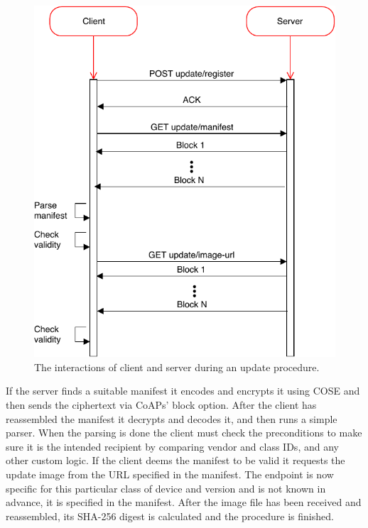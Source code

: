 \documentclass[0-thesis.tex]{subfiles}
\begin{document}
\begin{figure}
    \caption{The interactions of client and server during an update procedure.}
    \label{fig:client-server-interaction}
    \includegraphics{images/client-server-sequence.pdf}
\end{figure}

If the server finds a suitable manifest it encodes and encrypts it using COSE and then
sends the ciphertext via CoAPs' block option. After the client has reassembled the
manifest it decrypts and decodes it, and then runs a simple parser. When the parsing is
done the client must check the preconditions to make sure it is the intended recipient by
comparing vendor and class IDs, and any other custom logic. If the client deems the
manifest to be valid it requests the update image from the URL specified in the manifest.
The endpoint is now specific for this particular class of device and version and is not
known in advance, it is specified in the manifest. After the image file has been received
and reassembled, its SHA-256 digest is calculated and the procedure is finished.
\end{document}
